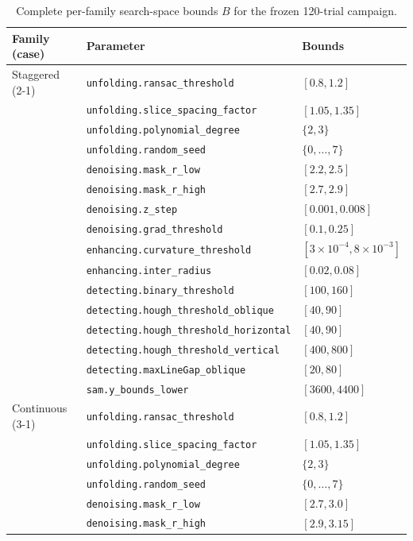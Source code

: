 \documentclass[a4paper,fleqn]{cas-dc}
\begin{document}
{\begin{table}[t]
\caption{Complete per-family search-space bounds $B$ for the frozen 120-trial campaign.}\label{tab:bo-bounds}
{\small
\begin{tabular*}{\textwidth}{@{\extracolsep{\fill}} llp{} @{}}
\toprule
Family (case) & Parameter & Bounds \\
\midrule
Staggered (2-1) & \texttt{unfolding.ransac\_threshold} & $[0.8,1.2]$ \\
 & \texttt{unfolding.slice\_spacing\_factor} & $[1.05,1.35]$ \\
 & \texttt{unfolding.polynomial\_degree} & $\{2,3\}$ \\
 & \texttt{unfolding.random\_seed} & $\{0,\ldots,7\}$ \\
 & \texttt{denoising.mask\_r\_low} & $[2.2,2.5]$ \\
 & \texttt{denoising.mask\_r\_high} & $[2.7,2.9]$ \\
 & \texttt{denoising.z\_step} & $[0.001,0.008]$ \\
 & \texttt{denoising.grad\_threshold} & $[0.1,0.25]$ \\
 & \texttt{enhancing.curvature\_threshold} & $[3{\times}10^{-4},8{\times}10^{-3}]$ \\
 & \texttt{enhancing.inter\_radius} & $[0.02,0.08]$ \\
 & \texttt{detecting.binary\_threshold} & $[100,160]$ \\
 & \texttt{detecting.hough\_threshold\_oblique} & $[40,90]$ \\
 & \texttt{detecting.hough\_threshold\_horizontal} & $[40,90]$ \\
 & \texttt{detecting.hough\_threshold\_vertical} & $[400,800]$ \\
 & \texttt{detecting.maxLineGap\_oblique} & $[20,80]$ \\
 & \texttt{sam.y\_bounds\_lower} & $[3600,4400]$ \\
\addlinespace
Continuous (3-1) & \texttt{unfolding.ransac\_threshold} & $[0.8,1.2]$ \\
 & \texttt{unfolding.slice\_spacing\_factor} & $[1.05,1.35]$ \\
 & \texttt{unfolding.polynomial\_degree} & $\{2,3\}$ \\
 & \texttt{unfolding.random\_seed} & $\{0,\ldots,7\}$ \\
 & \texttt{denoising.mask\_r\_low} & $[2.7,3.0]$ \\
 & \texttt{denoising.mask\_r\_high} & $[2.9,3.15]$ \\

\end{tabular*}}
\end{table}}
\end{document}
